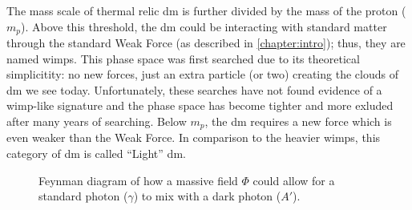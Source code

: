 The mass scale of thermal relic \ac{dm} is further divided by the mass of the proton ($m_p$). Above
this threshold, the \ac{dm} could be interacting with standard matter through the standard Weak
Force (as described in \cref{chapter:intro}); thus, they are named \acp{wimp}. This phase space was
first searched due to its theoretical simplicitity: no new forces, just an extra particle (or two)
creating the clouds of \ac{dm} we see today. Unfortunately, these searches have not found evidence
of a \ac{wimp}-like signature\cite{supercdms-2018,damic-2020,xenon1t-2018} and the phase space has
become tighter and more exluded after many years of searching. Below $m_p$, the \ac{dm} requires a
new force which is even weaker than the Weak Force. In comparison to the heavier \acp{wimp}, this
category of \ac{dm} is called ``Light'' \ac{dm}.

\begin{figure}
  \centering
  
  \caption{Feynman diagram of how a massive field $\Phi$ could allow for a standard photon ($\gamma$)
    to mix with a dark photon ($A'$).}
  \label{fig:photon-mixing}
\end{figure}

